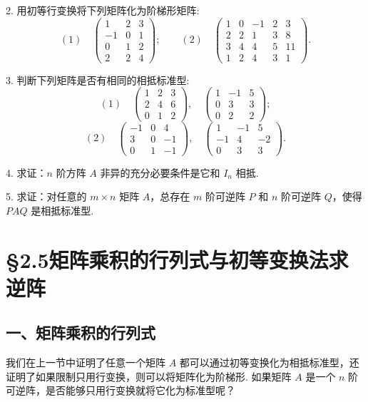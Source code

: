 \documentclass[UTF8,12pt,a4paper,fontset=fandol]{ctexart}
\begin{document}
2. 用初等行变换将下列矩阵化为阶梯形矩阵:
\[
(1)\quad
\left(\begin{array}{rrr}
1 & 2 & 3\\
-1 & 0 & 1\\
0 & 1 & 2\\
2 & 2 & 4
\end{array}\right);
\qquad
(2)\quad
\left(\begin{array}{rrrrr}
1 & 0 & -1 & 2 & 3\\
2 & 2 & 1 & 3 & 8\\
3 & 4 & 4 & 5 & 11\\
1 & 2 & 4 & 3 & 1
\end{array}\right).
\]

3. 判断下列矩阵是否有相同的相抵标准型:
\[
(1)\quad
\left(\begin{array}{rrr}
1 & 2 & 3\\
2 & 4 & 6\\
0 & 1 & 2
\end{array}\right),\quad
\left(\begin{array}{rrr}
1 & -1 & 5\\
0 & 3 & 3\\
0 & 2 & 2
\end{array}\right);
\]
\[
(2)\quad
\left(\begin{array}{rrr}
-1 & 0 & 4\\
3 & 0 & -1\\
0 & 1 & -1
\end{array}\right),\quad
\left(\begin{array}{rrr}
1 & -1 & 5\\
-1 & 4 & -2\\
0 & 3 & 3
\end{array}\right).
\]

4. 求证：$n$ 阶方阵 $A$ 非异的充分必要条件是它和 $I_n$ 相抵.

5. 求证：对任意的 $m\times n$ 矩阵 $A$，总存在 $m$ 阶可逆阵 $P$ 和 $n$ 阶可逆阵 $Q$，使得 $PAQ$ 是相抵标准型.

\section*{§2.5\quad 矩阵乘积的行列式与初等变换法求逆阵}

\subsection*{一、矩阵乘积的行列式}

我们在上一节中证明了任意一个矩阵 $A$ 都可以通过初等变换化为相抵标准型，还证明了如果限制只用行变换，则可以将矩阵化为阶梯形. 如果矩阵 $A$ 是一个 $n$ 阶可逆阵，是否能够只用行变换就将它化为标准型呢？
\end{document}
